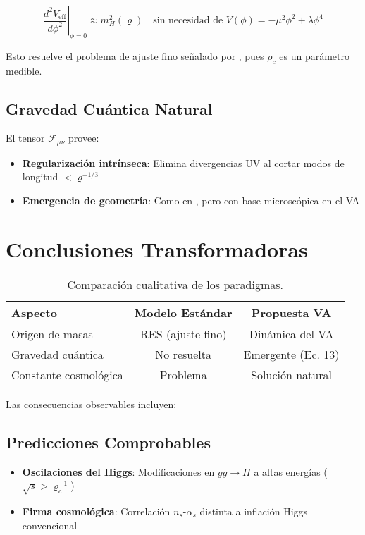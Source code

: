 \documentclass[twoside]{article}
\theoremstyle{definition}
\theoremstyle{remark}
\numberwithin{equation}{section}
\theoremstyle{definition}
\theoremstyle{example}
\theoremstyle{remark}
\numberwithin{equation}{section}%
\begin{document}
		\begin{equation}
			\left. \frac{d^2V_{\text{eff}}}{d\phi^2} \right|_{\phi=0} \approx m_H^2(\varrho) \quad \text{sin necesidad de } V(\phi)=-\mu^2\phi^2 + \lambda\phi^4
		\end{equation}
		
		Esto resuelve el problema de ajuste fino señalado por \cite{Bezrukov2008}, pues $\rho_c$ es un parámetro medible.
		
		\subsection{Gravedad Cuántica Natural}
		El tensor $\mathcal{F}_{\mu\nu}$ provee:
		
		\begin{itemize}
			\item \textbf{Regularización intrínseca}: Elimina divergencias UV al cortar modos de longitud $<\varrho^{-1/3}$
			\item \textbf{Emergencia de geometría}: Como en \cite{Padmanabhan2016}, pero con base microscópica en el VA
		\end{itemize}
		
		\section{Conclusiones Transformadoras}
		
		\begin{table}[H]
			\centering
			\begin{tabular}{|l|c|c|}
				\hline
				\textbf{Aspecto} & \textbf{Modelo Estándar} & \textbf{Propuesta VA} \\ \hline
				Origen de masas & RES (ajuste fino) & Dinámica del VA \\ \hline
				Gravedad cuántica & No resuelta & Emergente (Ec. 13) \\ \hline
				Constante cosmológica & Problema & Solución natural \\ \hline
			\end{tabular}
			\caption{Comparación cualitativa de los paradigmas.}
			\label{tab:revolucion}
		\end{table}
		
		Las consecuencias observables incluyen:
		
		\subsection{Predicciones Comprobables}
		\begin{itemize}
			\item \textbf{Oscilaciones del Higgs}: Modificaciones en $gg \to H$ a altas energías ($\sqrt{s} > \varrho_c^{-1}$)
			\item \textbf{Firma cosmológica}: Correlación $n_s$-$\alpha_s$ distinta a inflación Higgs convencional \cite{Bezrukov2008}
		\end{itemize}
		
\end{document}
